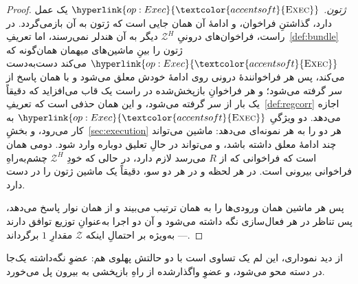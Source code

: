\documentclass[10pt,oneside,openany]{book}
\newcommand{\Zenv}{\mathcal{Z}}
\newcommand{\op}[1]{\textnormal{\textsc{#1}}}
\newcommand{\opl}[1]{\hyperlink{op:#1}{\textcolor{accentsoft}{\op{#1}}}}
\theoremstyle{accentdef}
\theoremstyle{accentplain}
\begin{document}
\begin{proof}
\emph{ژتون.} $\opl{Exec}$ یک عمل دارد، گذاشتنِ فراخوان، و ادامهٔ آن همان
جایی است که ژتون به آن بازمی‌گردد. در راست، فراخوان‌های درونیِ $\Zenv^{H}$
دیگر به آن هندلر نمی‌رسند، اما تعریفِ~\ref{def:bundle} ژتون را بینِ
ماشین‌های میهمان همان‌گونه که $\opl{Exec}$ می‌کند دست‌به‌دست می‌کند، پس هر
فراخوانندهٔ درونی روی ادامهٔ خودش معلق می‌شود و با همان پاسخ از سر گرفته
می‌شود؛ و هر فراخوانِ بازپخش‌شده در راست یک قاب می‌افزاید که دقیقاً یک بار
از سر گرفته می‌شود، و این همان حذفی است که تعریفِ~\ref{def:regcorr} اجازه
می‌دهد. دو ویژگیِ $\opl{Exec}$ به کار می‌رود، و
بخشِ~\ref{sec:execution} هر دو را به هر نمونه‌ای می‌دهد: ماشین می‌تواند
چند ادامهٔ معلق داشته باشد، و می‌تواند در حالِ تعلیق دوباره وارد شود. دومی
همان است که فراخوانی که از $R$ می‌رسد لازم دارد، در حالی که خودِ
$\Zenv^{H}$ چشم‌به‌راهِ فراخوانی بیرونی است. در هر لحظه و در هر دو سو،
دقیقاً یک ماشین ژتون را در دست دارد.

پس هر ماشین همان ورودی‌ها را به همان ترتیب می‌بیند و از همان نوار پاسخ
می‌دهد، پس تناظر در هر فعال‌سازی نگه داشته می‌شود و آن دو اجرا به‌عنوانِ
توزیع توافق دارند --- به‌ویژه بر احتمالِ اینکه $\Zenv$ مقدارِ $1$
برگرداند.
\end{proof}

از دید نموداری، این لم یک تساوی است با دو حالتش پهلوی هم: عضوِ
نگه‌داشته یک‌جا در دسته محو می‌شود، و عضوِ واگذارشده از راهِ بازپخشی به
بیرون پل می‌خورد.
\end{document}
